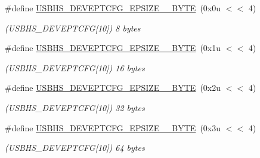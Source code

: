\begin{DoxyCompactItemize}
\item 
\mbox{\label{group__SAMV71__USBHS_ga76ef3637dc2e686e84af8f8a8dd47c75}} 
\#define \mbox{\hyperlink{group__SAMV71__USBHS_ga76ef3637dc2e686e84af8f8a8dd47c75}{U\+S\+B\+H\+S\+\_\+\+D\+E\+V\+E\+P\+T\+C\+F\+G\+\_\+\+E\+P\+S\+I\+Z\+E\+\_\+\_\+\+B\+Y\+TE}}~(0x0u $<$$<$ 4)
\begin{DoxyCompactList}\small\item\em (U\+S\+B\+H\+S\+\_\+\+D\+E\+V\+E\+P\+T\+C\+FG\mbox{[}10\mbox{]}) 8 bytes \end{DoxyCompactList}\item 
\mbox{\label{group__SAMV71__USBHS_ga028f507272a99734cc04ae02211133f4}} 
\#define \mbox{\hyperlink{group__SAMV71__USBHS_ga028f507272a99734cc04ae02211133f4}{U\+S\+B\+H\+S\+\_\+\+D\+E\+V\+E\+P\+T\+C\+F\+G\+\_\+\+E\+P\+S\+I\+Z\+E\+\_\+\_\+\+B\+Y\+TE}}~(0x1u $<$$<$ 4)
\begin{DoxyCompactList}\small\item\em (U\+S\+B\+H\+S\+\_\+\+D\+E\+V\+E\+P\+T\+C\+FG\mbox{[}10\mbox{]}) 16 bytes \end{DoxyCompactList}\item 
\mbox{\label{group__SAMV71__USBHS_gab2e727848abe36c82c1ed5ab621a68a1}} 
\#define \mbox{\hyperlink{group__SAMV71__USBHS_gab2e727848abe36c82c1ed5ab621a68a1}{U\+S\+B\+H\+S\+\_\+\+D\+E\+V\+E\+P\+T\+C\+F\+G\+\_\+\+E\+P\+S\+I\+Z\+E\+\_\+\_\+\+B\+Y\+TE}}~(0x2u $<$$<$ 4)
\begin{DoxyCompactList}\small\item\em (U\+S\+B\+H\+S\+\_\+\+D\+E\+V\+E\+P\+T\+C\+FG\mbox{[}10\mbox{]}) 32 bytes \end{DoxyCompactList}\item 
\mbox{\label{group__SAMV71__USBHS_ga801cd9c63c16350a53e9bc2d92872980}} 
\#define \mbox{\hyperlink{group__SAMV71__USBHS_ga801cd9c63c16350a53e9bc2d92872980}{U\+S\+B\+H\+S\+\_\+\+D\+E\+V\+E\+P\+T\+C\+F\+G\+\_\+\+E\+P\+S\+I\+Z\+E\+\_\+\_\+\+B\+Y\+TE}}~(0x3u $<$$<$ 4)
\begin{DoxyCompactList}\small\item\em (U\+S\+B\+H\+S\+\_\+\+D\+E\+V\+E\+P\+T\+C\+FG\mbox{[}10\mbox{]}) 64 bytes \end{DoxyCompactList}\item 
\mbox{\label{group__SAMV71__USBHS_gaada6b4c339fd81152ebf6b88657ce678}} 

\end{DoxyCompactItemize}
